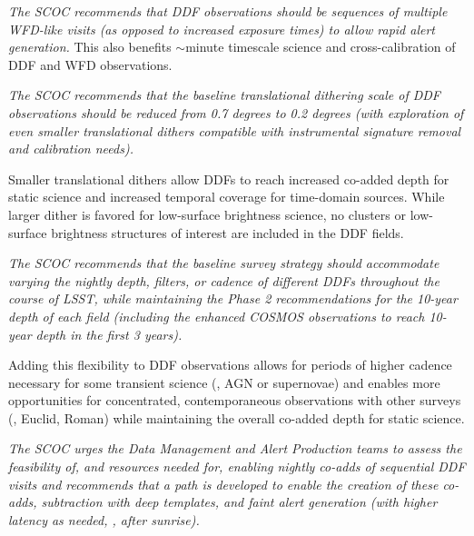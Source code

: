 
{\it The SCOC recommends that DDF observations should be sequences of multiple WFD-like visits (as opposed to increased exposure times) to allow rapid alert generation.}
This also benefits $\sim$minute timescale science and cross-calibration of DDF and WFD observations. 

{\it The SCOC recommends that the baseline translational dithering scale of DDF observations should be reduced from 0.7 degrees to 0.2 degrees (with exploration of even smaller translational dithers compatible with instrumental signature removal and calibration needs).
}

Smaller translational dithers allow DDFs to reach increased co-added depth for static science and increased temporal coverage for time-domain sources. While larger dither is favored for low-surface brightness science, no clusters or low-surface brightness structures of interest are included in the DDF fields.


{\it The SCOC recommends that the baseline survey strategy should accommodate varying the nightly depth, filters, or cadence of different DDFs throughout the course of LSST, while maintaining the Phase 2 recommendations for the 10-year depth of each field (including the enhanced COSMOS observations to reach 10-year depth in the first 3 years).}

Adding this flexibility to DDF observations allows for periods of higher cadence necessary for some transient science (\eg , AGN or supernovae) and enables more opportunities for concentrated, contemporaneous observations with other surveys (\eg , Euclid, Roman) while maintaining the overall co-added depth for static science.

{\it The SCOC urges the Data Management and Alert Production teams to assess the feasibility of, and resources needed for, enabling nightly co-adds of sequential DDF visits and recommends that a path is developed to enable the creation of these co-adds, subtraction with deep templates, and faint alert generation (with higher latency as needed, \eg , after sunrise). 
}

